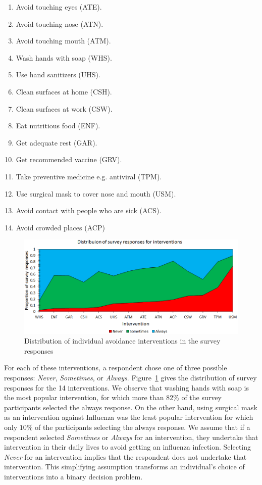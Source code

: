 \documentclass[doublespace,draft]{VTthesis}
\begin{document}
	\begin{enumerate}
	    \item Avoid touching eyes (ATE).
	    \item Avoid touching nose (ATN).
	    \item Avoid touching mouth (ATM).
        \item Wash hands with soap (WHS).
        \item Use hand sanitizers (UHS).
        \item Clean surfaces at home (CSH).
        \item Clean surfaces at work (CSW).
        \item Eat nutritious food (ENF).
        \item Get adequate rest (GAR).
        \item Get recommended vaccine (GRV).
        \item Take preventive medicine e.g. antiviral (TPM).
        \item Use surgical mask to cover nose and mouth (USM).
        \item Avoid contact with people who are sick (ACS).
        \item Avoid crowded places (ACP)
	\end{enumerate}
	\begin{figure}
    \centering
    \includegraphics[width=\textwidth]{figures/avoidancebehaviors.png}
    \caption{Distribution of individual avoidance interventions in the survey responses}
    \label{fig:avoidance}
    \end{figure}
	For each of these interventions, a respondent chose one of three possible responses: \emph{Never}, \emph{Sometimes}, or \emph{Always}. Figure~\ref{fig:avoidance} gives the distribution of survey responses for the 14 interventions. We observe that washing hands with soap is the most popular intervention, for which more than $82\%$ of the survey participants selected the always response. On the other hand, using surgical mask as an intervention against Influenza was the least popular intervention for which only $10\%$ of the participants selecting the always response. We assume that if a respondent selected \emph{Sometimes} or \emph{Always} for an intervention, they undertake that intervention in their daily lives to avoid getting an influenza infection. Selecting \emph{Never} for an intervention implies that the respondent does not undertake that intervention. This simplifying assumption transforms an individual's choice of interventions into a binary decision problem. 
\end{document}
